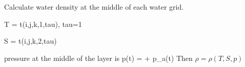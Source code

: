 
Calculate water density at the middle of each water grid.
\been

\item T = t(i,j,k,1,tau), tau=1
\item S = t(i,j,k,2,tau)
\item pressure at the middle of the layer is
\be
p(t) =   + p_a(t)
\ee
Then $\rho = \rho(T,S,p)$
\enen


